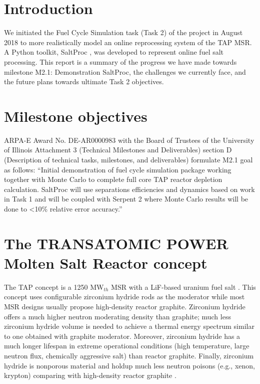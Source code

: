 \documentclass[12pt]{article} %
\begin{document}
\section{Introduction}
We initiated the Fuel Cycle Simulation task (Task 2) of the project in August 2018 to more realistically model an online reprocessing system of the \gls{TAP} \gls{MSR}. A Python toolkit, SaltProc \cite{rykhlevskii_modeling_2019, rykhlevskii_advanced_2018, rykhlevskii_arfc/saltproc_2018}, was developed to represent online fuel salt processing. This report is a summary of the progress we have made towards milestone M2.1: Demonstration SaltProc, the challenges we currently face, and the future plans towards ultimate Task 2 objectives.

\section{Milestone objectives}
ARPA-E Award No. DE-AR0000983 with the Board of Trustees of the University of Illinois Attachment 3 (Technical Milestones and Deliverables) section D (Description of technical tasks, milestones, and deliverables) formulate M2.1 goal as follows:
``Initial demonstration of fuel cycle simulation package working together with Monte Carlo to complete full core TAP reactor depletion calculation. SaltProc will use separations efficiencies and dynamics based on work in Task 1 and will be coupled with Serpent 2 where Monte Carlo results will be done to <10\% relative error accuracy.''

\section{The TRANSATOMIC POWER Molten Salt Reactor concept}
The \gls{TAP} concept is a 1250 MW$_{th}$ \gls{MSR} with a LiF-based uranium fuel 
salt \cite{transatomic_power_corporation_technical_2016}. This concept uses 
configurable zirconium hydride rods as the moderator while most \gls{MSR} designs 
usually propose high-density reactor graphite. Zirconium hydride offers a much 
higher neutron moderating density than graphite; much less zirconium hydride 
volume is needed to achieve a thermal energy spectrum similar to one obtained 
with graphite moderator. Moreover, zirconium hydride has a much 
longer lifespan in extreme operational conditions (high temperature, large 
neutron flux, chemically aggressive salt) than reactor graphite. Finally, 
zirconium hydride is nonporous material and holdup much less neutron poisons 
(e.g., xenon, krypton) comparing with high-density reactor graphite \cite{transatomic_power_corporation_technical_2016, transatomic_power_corporation_neutronics_2016, betzler_two-dimensional_2016}.
\end{document}
